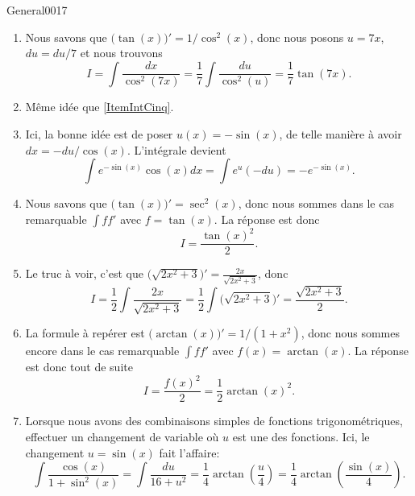 \begin{corrige}{General0017}
\begin{enumerate}
\item
Nous savons que $\big( \tan(x) \big)'=1/\cos^2(x)$, donc nous posons $u=7x$, $du=du/7$ et nous trouvons
\begin{equation}
	I=\int\frac{ dx }{ \cos^2(7x) }=\frac{1}{ 7 }\int\frac{ du }{ \cos^2(u) }=\frac{1}{ 7 }\tan(7x).
\end{equation}

\item Même idée que \ref{ItemIntCinq}.

\item
Ici, la bonne idée est de poser $u(x)=-\sin(x)$, de telle manière à avoir $dx=-du/\cos(x)$. L'intégrale devient
\begin{equation}
	\int e^{-\sin(x)}\cos(x)dx=\int e^u(-du)=- e^{-\sin(x)}.
\end{equation}

\item
Nous savons que $\big( \tan(x) \big)'=\sec^2(x)$, donc nous sommes dans le cas remarquable $\int ff'$ avec $f=\tan(x)$. La réponse est donc
\begin{equation}
	I=\frac{ \tan(x)^2 }{2}.
\end{equation}

\item
Le truc à voir, c'est que $\big( \sqrt{2x^2+3} \big)'=\frac{ 2x }{ \sqrt{2x^2+3} }$, donc
\begin{equation}
	I=\frac{ 1 }{2}\int \frac{ 2x }{ \sqrt{2x^2+3} }=\frac{ 1 }{2}\int \big( \sqrt{2x^2+3} \big)'=\frac{ \sqrt{2x^2+3} }{2}.
\end{equation}

\item
La formule à repérer est $\big(\arctan(x)\big)'=1/(1+x^2)$, donc nous sommes encore dans le cas remarquable $\int ff'$ avec $f(x)=\arctan(x)$. La réponse est donc tout de suite
\begin{equation}
	I=\frac{ f(x)^2 }{ 2 }=\frac{ 1 }{2}\arctan(x)^2.
\end{equation}

\item
Lorsque nous avons des combinaisons simples de fonctions trigonométriques, effectuer un changement de variable où $u$ est une des fonctions. Ici, le changement $u=\sin(x)$ fait l'affaire:
\begin{equation}
	\int\frac{ \cos(x) }{ 1+\sin^2(x) }=\int\frac{ du }{ 16+u^2 }=\frac{1}{ 4 }\arctan\left( \frac{ u }{ 4 } \right)=\frac{1}{ 4 }\arctan\left( \frac{ \sin(x) }{ 4 } \right).
\end{equation}


\end{enumerate}
\end{corrige}
